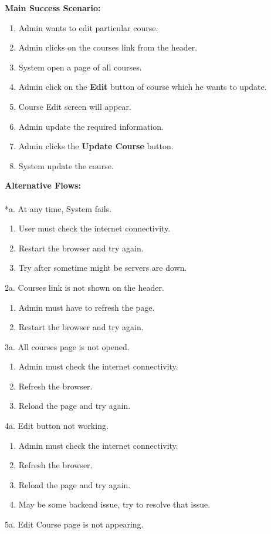 \textbf{Main Success Scenario:}
\begin{enumerate}
\item Admin wants to edit particular course.
\item Admin clicks on the courses link from the header.
\item System open a page of all courses.
\item Admin click on the \textbf{Edit} button of course which he wants to update.
\item Course Edit screen will appear.
\item Admin update the required information.
\item Admin clicks the \textbf{Update Course} button.
\item System update the course.
\end{enumerate}
\textbf{Alternative Flows:}\\
\\
*a. At any time, System fails.
\begin{enumerate}
\item User must check the internet connectivity.
\item Restart the browser and try again.
\item Try after sometime might be servers are down.
\end{enumerate}
2a. Courses link is not shown on the header.
\begin{enumerate}
\item Admin must have to refresh the page.
\item Restart the browser and try again.
\end{enumerate} 
3a. All courses page is not opened.
\begin{enumerate}
\item Admin must check the internet connectivity.
\item Refresh the browser.
\item Reload the page and try again.
\end{enumerate}
4a. Edit button not working.
\begin{enumerate}
\item Admin must check the internet connectivity.
\item Refresh the browser.
\item Reload the page and try again.
\item May be some backend issue, try to resolve that issue.
\end{enumerate}
5a. Edit Course page is not appearing.
